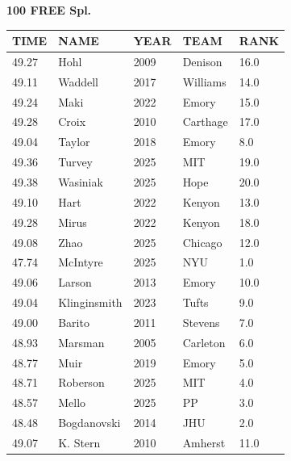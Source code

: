 \begin{table}[H]
\centering
\begin{minipage}[t]{0.6\textwidth}
\centering
\textbf{100 FREE Spl.}\\[0.1cm]
\begin{tabular}{@{}p{1.8cm}p{2.8cm}p{1.2cm}p{1.4cm}p{0.8cm}@{}}
\hline
    \textbf{TIME} & \textbf{NAME} & \textbf{YEAR} & \textbf{TEAM} & \textbf{RANK} \\
\hline
    49.27 & Hohl & 2009 & Denison & 16.0 \\
    49.11 & Waddell & 2017 & Williams & 14.0 \\
    49.24 & Maki & 2022 & Emory & 15.0 \\
    49.28 & Croix & 2010 & Carthage & 17.0 \\
    49.04 & Taylor & 2018 & Emory & 8.0 \\
    49.36 & Turvey & 2025 & MIT & 19.0 \\
    49.38 & Wasiniak & 2025 & Hope & 20.0 \\
    49.10 & Hart & 2022 & Kenyon & 13.0 \\
    49.28 & Mirus & 2022 & Kenyon & 18.0 \\
    49.08 & Zhao & 2025 & Chicago & 12.0 \\
    47.74 & McIntyre & 2025 & NYU & 1.0 \\
    49.06 & Larson & 2013 & Emory & 10.0 \\
    49.04 & Klinginsmith & 2023 & Tufts & 9.0 \\
    49.00 & Barito & 2011 & Stevens & 7.0 \\
    48.93 & Marsman & 2005 & Carleton & 6.0 \\
    48.77 & Muir & 2019 & Emory & 5.0 \\
    48.71 & Roberson & 2025 & MIT & 4.0 \\
    48.57 & Mello & 2025 & PP & 3.0 \\
    48.48 & Bogdanovski & 2014 & JHU & 2.0 \\
    49.07 & K. Stern & 2010 & Amherst & 11.0 \\
\hline
\end{tabular}
\end{minipage}
\end{table}

